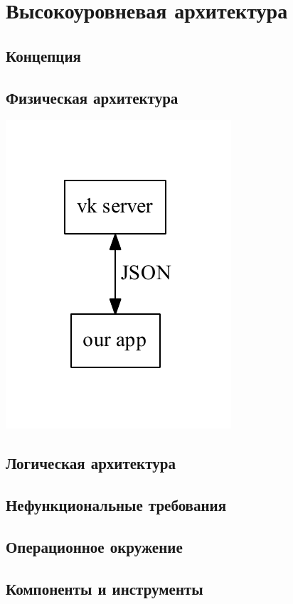 \documentclass[12pt]{article}
\begin{document}
\section*{Высокоуровневая архитектура}

\subsection*{Концепция}

\subsection*{Физическая архитектура}
\includegraphics{./diag/phys.pdf}

\subsection*{Логическая архитектура}

\subsection*{Нефункциональные требования}

\subsection*{Операционное окружение}
% 

\subsection*{Компоненты и инструменты}
% 
\end{document}
